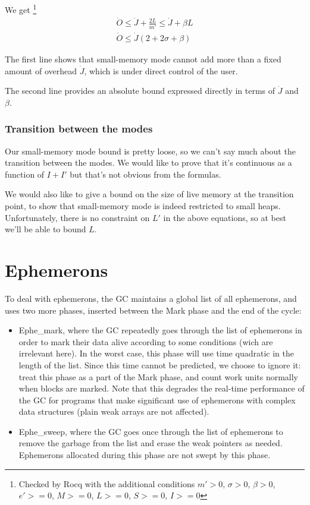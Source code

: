 \documentclass{article}
\begin{document}
We get
\footnote{
Checked by Rocq with the additional conditions
$m' > 0$,
$\sigma > 0$,
$\beta > 0$,
$e' >= 0$,
$M >= 0$,
$L >= 0$,
$S >= 0$,
$I >= 0$
}
\begin{gather*}
\dot{O} \leq \dot{J} + \frac{2L}{m'} \leq \dot{J} + \beta L \\
\dot{O} \leq \dot{J} (2 + 2\sigma + \beta)
\end{gather*}

The first line shows that small-memory mode cannot add more than a
fixed amount of overhead $\dot{J}$, which is under direct control of
the user.

The second line provides an absolute bound expressed directly in terms
of $\dot{J}$ and $\beta$.

\subsubsection{Transition between the modes}

Our small-memory mode bound is pretty loose, so we can't say much
about the transition between the modes. We would like to prove that
it's continuous as a function of $I+I'$ but that's not obvious from
the formulas.

We would also like to give a bound on the size of live memory at the
transition point, to show that small-memory mode is indeed restricted
to small heaps. Unfortunately, there is no constraint on $L'$ in the
above equations, so at best we'll be able to bound $L$.

\section{Ephemerons}

To deal with ephemerons, the GC maintains a global list of all
ephemerons, and uses two more phases, inserted between
the Mark phase and the end of the cycle:
\begin{itemize}
\item Ephe\_mark, where the GC repeatedly goes through the list of
ephemerons in order to mark their data alive according to some
conditions (wich are irrelevant here). In the worst case, this phase
will use time quadratic in the length of the list. Since this time
cannot be predicted, we choose to ignore it: treat this phase as a
part of the Mark phase, and count work units normally when blocks are
marked. Note that this degrades the real-time performance of the GC
for programs that make significant use of ephemerons with complex data
structures (plain weak arrays are not affected).
\item Ephe\_sweep, where the GC goes once through the list of
ephemerons to remove the garbage from the list and erase the weak
pointers as needed. Ephemerons allocated during this phase are not
swept by this phase.
\end{itemize}
\end{document}
